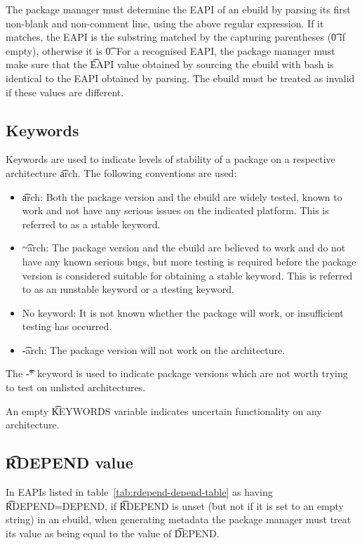 The package manager must determine the EAPI of an ebuild by parsing its first non-blank and
non-comment line, using the above regular expression. If it matches, the EAPI is the substring
matched by the capturing parentheses (\t{0} if empty), otherwise it is \t{0}. For a recognised
EAPI, the package manager must make sure that the \t{EAPI} value obtained by sourcing the ebuild
with bash is identical to the EAPI obtained by parsing. The ebuild must be treated as invalid if
these values are different.

\subsection{Keywords}
\label{sec:keywords}

Keywords are used to indicate levels of stability of a package on a respective architecture
\t{arch}. The following conventions are used:
\begin{itemize}
\item \t{arch}: Both the package version and the ebuild are widely tested, known to work and not
    have any serious issues on the indicated platform. This is referred to as a \i{stable keyword}.
\item \t{\textasciitilde arch}: The package version and the ebuild are believed to work and do
    not have any known serious bugs, but more testing is required before the package version is
    considered suitable for obtaining a stable keyword. This is referred to as an \i{unstable
    keyword} or a \i{testing keyword}.
\item No keyword: It is not known whether the package will work, or insufficient testing has
    occurred.
\item \t{-arch}: The package version will not work on the architecture.
\end{itemize}
The \t{-*} keyword is used to indicate package versions which are not worth trying to test on
unlisted architectures.

An empty \t{KEYWORDS} variable indicates uncertain functionality on any architecture.

\subsection{\t{RDEPEND} value}
\label{sec:rdepend-depend}

 In EAPIs listed in table~\ref{tab:rdepend-depend-table} as having
\t{RDEPEND=DEPEND}, if \t{RDEPEND} is unset (but not if it is set to an empty string) in an ebuild,
when generating metadata the package manager must treat its value as being equal to the value of
\t{DEPEND}.

